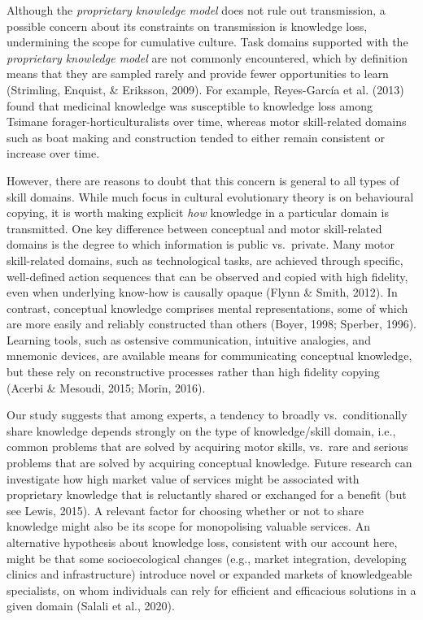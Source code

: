 \documentclass[
  11pt,
]{article}
\begin{document}
Although the \emph{proprietary knowledge model} does not rule out transmission, a possible concern about its constraints on transmission is knowledge loss, undermining the scope for cumulative culture. Task domains supported with the \emph{proprietary knowledge model} are not commonly encountered, which by definition means that they are sampled rarely and provide fewer opportunities to learn (Strimling, Enquist, \& Eriksson, 2009). For example, Reyes-García et al. (2013) found that medicinal knowledge was susceptible to knowledge loss among Tsimane forager-horticulturalists over time, whereas motor skill-related domains such as boat making and construction tended to either remain consistent or increase over time.

However, there are reasons to doubt that this concern is general to all types of skill domains. While much focus in cultural evolutionary theory is on behavioural copying, it is worth making explicit \emph{how} knowledge in a particular domain is transmitted. One key difference between conceptual and motor skill-related domains is the degree to which information is public vs.~private. Many motor skill-related domains, such as technological tasks, are achieved through specific, well-defined action sequences that can be observed and copied with high fidelity, even when underlying know-how is causally opaque (Flynn \& Smith, 2012). In contrast, conceptual knowledge comprises mental representations, some of which are more easily and reliably constructed than others (Boyer, 1998; Sperber, 1996). Learning tools, such as ostensive communication, intuitive analogies, and mnemonic devices, are available means for communicating conceptual knowledge, but these rely on reconstructive processes rather than high fidelity copying (Acerbi \& Mesoudi, 2015; Morin, 2016).

Our study suggests that among experts, a tendency to broadly vs.~conditionally share knowledge depends strongly on the type of knowledge/skill domain, i.e., common problems that are solved by acquiring motor skills, vs.~rare and serious problems that are solved by acquiring conceptual knowledge. Future research can investigate how high market value of services might be associated with proprietary knowledge that is reluctantly shared or exchanged for a benefit (but see Lewis, 2015). A relevant factor for choosing whether or not to share knowledge might also be its scope for monopolising valuable services. An alternative hypothesis about knowledge loss, consistent with our account here, might be that some socioecological changes (e.g., market integration, developing clinics and infrastructure) introduce novel or expanded markets of knowledgeable specialists, on whom individuals can rely for efficient and efficacious solutions in a given domain (Salali et al., 2020).
\end{document}
